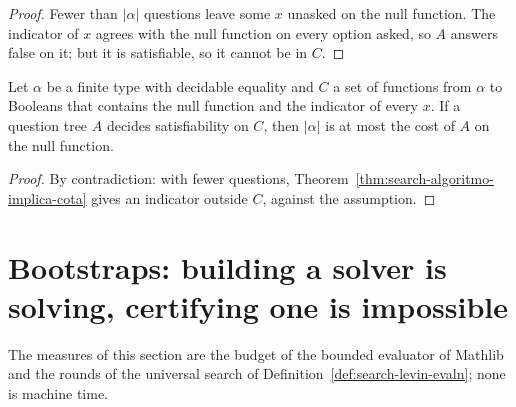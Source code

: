 \begin{proof}
  \leanok
  Fewer than $|\alpha|$ questions leave some $x$ unasked on the null function. The indicator of $x$
  agrees with the null function on every option asked, so $A$ answers false on it; but it is
  satisfiable, so it cannot be in $C$.
\end{proof}

\begin{theorem}
  \label{thm:search-contrapositiva}
  \leanok
  Let $\alpha$ be a finite type with decidable equality and $C$ a set of functions from $\alpha$ to
  Booleans that contains the null function and the indicator of every $x$. If a question tree $A$
  decides satisfiability on $C$, then $|\alpha|$ is at most the cost of $A$ on the null function.
  \own{}
  \exploration{}
\end{theorem}

\begin{proof}
  \leanok
  By contradiction: with fewer questions, Theorem~\ref{thm:search-algoritmo-implica-cota} gives an
  indicator outside $C$, against the assumption.
\end{proof}

\section{Bootstraps: building a solver is solving, certifying one is impossible}
\label{sec:search-bootstraps}

The measures of this section are the budget of the bounded evaluator of Mathlib and the rounds of the
universal search of Definition~\ref{def:search-levin-evaln}; none is machine time.


